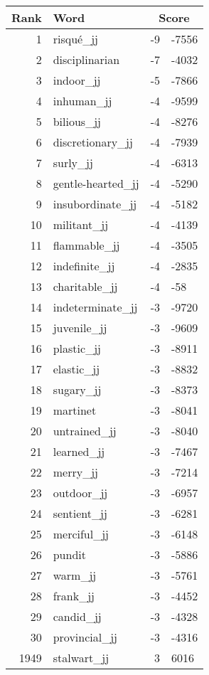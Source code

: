 \begin{longtable}[!htbp]{| rlr@{.}l |}
    \hline
    \textbf{Rank} & \textbf{Word} & \multicolumn{2}{c|}{\textbf{Score}} \\
    \hline
    \endhead
    1 & risqué\_jj & -9 & -7556 \\
    2 & disciplinarian & -7 & -4032 \\
    3 & indoor\_jj & -5 & -7866 \\
    4 & inhuman\_jj & -4 & -9599 \\
    5 & bilious\_jj & -4 & -8276 \\
    6 & discretionary\_jj & -4 & -7939 \\
    7 & surly\_jj & -4 & -6313 \\
    8 & gentle-hearted\_jj & -4 & -5290 \\
    9 & insubordinate\_jj & -4 & -5182 \\
    10 & militant\_jj & -4 & -4139 \\
    11 & flammable\_jj & -4 & -3505 \\
    12 & indefinite\_jj & -4 & -2835 \\
    13 & charitable\_jj & -4 & -58 \\
    14 & indeterminate\_jj & -3 & -9720 \\
    15 & juvenile\_jj & -3 & -9609 \\
    16 & plastic\_jj & -3 & -8911 \\
    17 & elastic\_jj & -3 & -8832 \\
    18 & sugary\_jj & -3 & -8373 \\
    19 & martinet & -3 & -8041 \\
    20 & untrained\_jj & -3 & -8040 \\
    21 & learned\_jj & -3 & -7467 \\
    22 & merry\_jj & -3 & -7214 \\
    23 & outdoor\_jj & -3 & -6957 \\
    24 & sentient\_jj & -3 & -6281 \\
    25 & merciful\_jj & -3 & -6148 \\
    26 & pundit & -3 & -5886 \\
    27 & warm\_jj & -3 & -5761 \\
    28 & frank\_jj & -3 & -4452 \\
    29 & candid\_jj & -3 & -4328 \\
    30 & provincial\_jj & -3 & -4316 \\
    1949 & stalwart\_jj & 3 & 6016 \\

\end{longtable}
